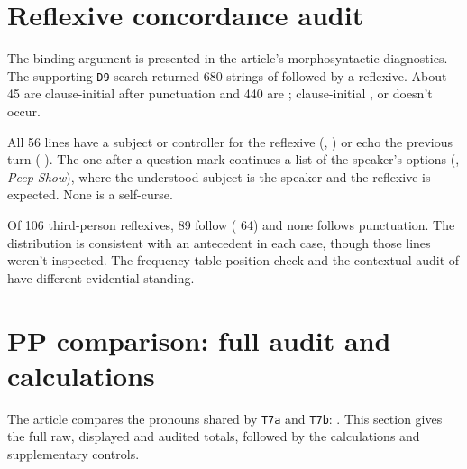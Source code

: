 \documentclass[12pt]{article}
\begin{document}
\clearpage
\section{Reflexive concordance audit}\label{supp:reflexives}

The binding argument is presented in the article's morphosyntactic diagnostics. The supporting \texttt{D9} search returned 680 strings of  followed by a reflexive. About 45 are clause-initial  after punctuation and 440 are ; clause-initial ,  or  doesn't occur.

All 56  lines have a subject or controller for the reflexive (, ) or echo the previous turn ( ). The one after a question mark continues a list of the speaker's options (, \emph{Peep Show}), where the understood subject is the speaker and the reflexive is expected. None is a self-curse.

Of 106 third-person reflexives, 89 follow  ( 64) and none follows punctuation. The distribution is consistent with an antecedent in each case, though those lines weren't inspected. The frequency-table position check and the contextual audit of  have different evidential standing.

\clearpage
\section{PP comparison: full audit and calculations}\label{supp:pp}

The article compares the pronouns shared by \texttt{T7a} and \texttt{T7b}: . This section gives the full raw, displayed and audited totals, followed by the calculations and supplementary controls.
\end{document}
